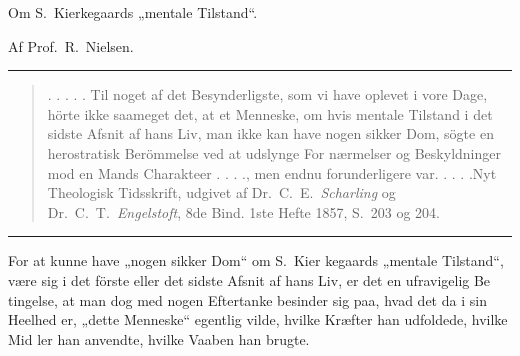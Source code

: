 \documentclass[12pt,a4paper]{article}
\newcommand{\opage}[1]{\marginnote{\footnotesize\textit{[#1]}}}
\begin{document}
\opage{1} %
\begin{center}
  {\large Om S.\ Kierkegaards „mentale Tilstand“.}

  \medskip
  Af Prof.\ R.\ Nielsen.
\end{center}

\bigskip
\begin{center}\rule{0.25\linewidth}{0.4pt}\end{center}
\bigskip

\begin{quote}\small
. . . . . Til noget af det Besynderligste, som vi have oplevet i vore
Dage, hörte ikke saameget det, at et Menneske, om hvis mentale
Tilstand i det sidste Afsnit af hans Liv, man ikke kan have nogen
sikker Dom, sögte en herostratisk Berömmelse ved at udslynge For\-%
nærmelser og Beskyldninger mod en Mands Charakteer . . . ., men
endnu forunderligere var. . . . .\quad Nyt Theologisk Tidsskrift, udgivet
af Dr.\ C.\ E.\ \emph{Scharling} og Dr.\ C.\ T.\ \emph{Engelstoft}, 8de Bind.
1ste Hefte 1857, S.\ 203 og 204.
\end{quote}

\bigskip
\begin{center}\rule{0.25\linewidth}{0.4pt}\end{center}
\bigskip

For at kunne have „nogen sikker Dom“ om S.\ Kier\-%
kegaards „mentale Tilstand“, være sig i det förste eller
det sidste Afsnit af hans Liv, er det en ufravigelig Be\-%
tingelse, at man dog med nogen Eftertanke besinder sig
paa, hvad det da i sin Heelhed er, „dette Menneske“
egentlig vilde, hvilke Kræfter han udfoldede, hvilke Mid\-%
ler han anvendte, hvilke Vaaben han brugte.
\end{document}
